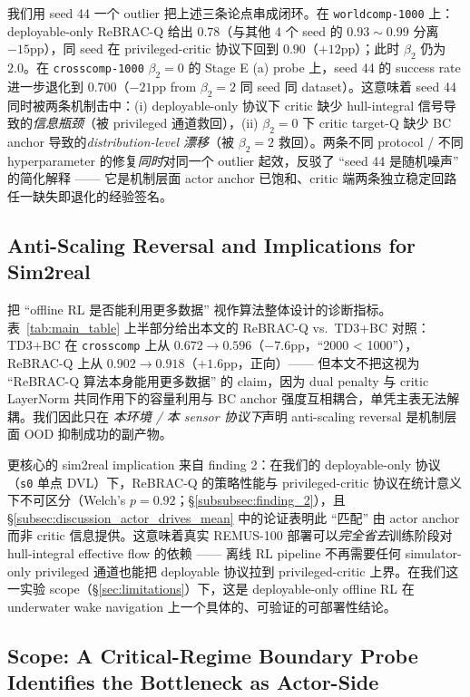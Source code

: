 我们用 seed 44 一个 outlier 把上述三条论点串成闭环。在 \texttt{worldcomp-1000} 上：deployable-only ReBRAC-Q 给出 $0.78$（与其他 4 个 seed 的 $0.93\sim0.99$ 分离 $-15$pp），同 seed 在 privileged-critic 协议下回到 $0.90$（$+12$pp）；此时 $\beta_2$ 仍为 $2.0$。在 \texttt{crosscomp-1000} $\beta_2 = 0$ 的 Stage E (a) probe 上，seed 44 的 success rate 进一步退化到 $0.700$（$-21$pp from $\beta_2 = 2$ 同 seed 同 dataset）。这意味着 seed 44 同时被两条机制击中：(i) deployable-only 协议下 critic 缺少 hull-integral 信号导致的\emph{信息瓶颈}（被 privileged 通道救回），(ii) $\beta_2 = 0$ 下 critic target-Q 缺少 BC anchor 导致的\emph{distribution-level 漂移}（被 $\beta_2 = 2$ 救回）。两条不同 protocol / 不同 hyperparameter 的修复\emph{同时}对同一个 outlier 起效，反驳了 ``seed 44 是随机噪声'' 的简化解释 —— 它是机制层面 actor anchor 已饱和、critic 端两条独立稳定回路任一缺失即退化的经验签名。

\subsection{Anti-Scaling Reversal and Implications for Sim2real}\label{subsec:discussion_implications}

\citet{tarasov2023rebrac} 把 ``offline RL 是否能利用更多数据'' 视作算法整体设计的诊断指标。表~\ref{tab:main_table} 上半部分给出本文的 ReBRAC-Q vs.\ TD3+BC 对照：TD3+BC 在 \texttt{crosscomp} 上从 $0.672 \to 0.596$（$-7.6$pp，``2000 < 1000''），ReBRAC-Q 上从 $0.902 \to 0.918$（$+1.6$pp，正向）—— 但本文不把这视为 ``ReBRAC-Q 算法本身能用更多数据'' 的 claim，因为 dual penalty 与 critic LayerNorm 共同作用下的容量利用与 BC anchor 强度互相耦合，单凭主表无法解耦。我们因此只在 \emph{本环境 / 本 sensor 协议下}声明 anti-scaling reversal 是机制层面 OOD 抑制成功的副产物。

更核心的 sim2real implication 来自 finding 2：在我们的 deployable-only 协议（\texttt{s0} 单点 DVL）下，ReBRAC-Q 的策略性能与 privileged-critic 协议在统计意义下不可区分（Welch's $p = 0.92$；\S\ref{subsubsec:finding_2}），且 \S\ref{subsec:discussion_actor_drives_mean} 中的论证表明此 ``匹配'' 由 actor anchor 而非 critic 信息提供。这意味着真实 REMUS-100 部署可以\emph{完全省去}训练阶段对 hull-integral effective flow 的依赖 —— 离线 RL pipeline 不再需要任何 simulator-only privileged 通道也能把 deployable 协议拉到 privileged-critic 上界。在我们这一实验 scope（\S\ref{sec:limitations}）下，这是 deployable-only offline RL 在 underwater wake navigation 上一个具体的、可验证的可部署性结论。

\subsection{Scope: A Critical-Regime Boundary Probe Identifies the Bottleneck as Actor-Side}\label{subsec:discussion_regime_boundary}

